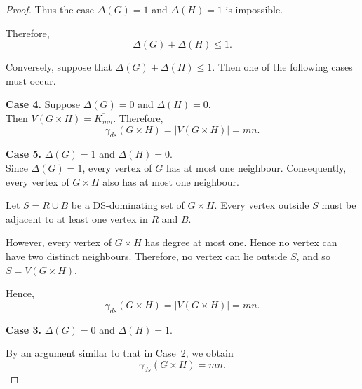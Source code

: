 \documentclass[10pt,a4paper]{amsart}
\begin{document}
\begin{proof}
Thus the case $\Delta(G)=1$ and $\Delta(H)=1$ is impossible.

Therefore,
\[
\Delta(G)+\Delta(H)\le1.
\]

Conversely, suppose that 
$\Delta(G)+\Delta(H)\le1$.
Then one of the following cases must occur.

\textbf{Case 4.}  Suppose $\Delta(G)=0$ and $\Delta(H)=0$.\\
Then $V(G\times H)=\overline{K_{mn}} $. Therefore, \[
\gamma_{ds}(G\times H)=|V(G\times H)|=mn.
\]



\textbf{Case 5.} $\Delta(G)=1$ and $\Delta(H)=0$.\\
Since $\Delta(G)=1$, every vertex of $G$ has at most one neighbour.
Consequently, every vertex of $G\times H$ also has at most one neighbour.

Let $S=R\cup B$
be a DS-dominating set of $G\times H$. Every vertex outside $S$ must be adjacent to at
least one vertex in $R$ and $B$.

However, every vertex of $G\times H$ has degree at most one. Hence no
vertex can have two distinct neighbours. Therefore, no vertex can lie
outside $S$, and so $
S=V(G\times H)$.

Hence,
\[
\gamma_{ds}(G\times H)=|V(G\times H)|=mn.
\]

\textbf{Case 3.} $\Delta(G)=0$ and $\Delta(H)=1$.

By an argument similar to that in Case~2, we obtain
\[
\gamma_{ds}(G\times H)=mn.
\]
\end{proof}
\end{document}
